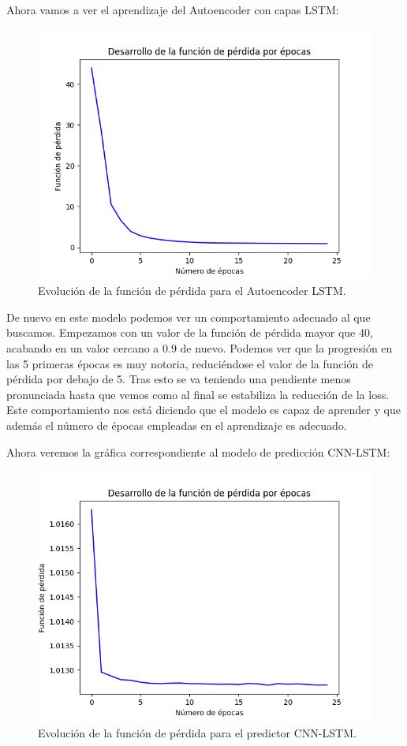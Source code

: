 Ahora vamos a ver el aprendizaje del Autoencoder con capas LSTM:
\begin{figure}[H]
	\centering
	\includegraphics[scale=0.75]{imagenes/loss_autoencoder_lstm.png}
	\caption{Evolución de la función de pérdida para el Autoencoder LSTM.}
	\label{img:loss-autoencoder-lstm}
\end{figure}

De nuevo en este modelo podemos ver un comportamiento adecuado al que buscamos. Empezamos con un valor de la función de pérdida mayor que 40, acabando en un valor cercano a $0.9$ de nuevo. Podemos ver que la progresión en las 5 primeras épocas es muy notoria, reduciéndose el valor de la función de pérdida por debajo de 5. Tras esto se va teniendo una pendiente menos pronunciada hasta que vemos como al final se estabiliza la reducción de la loss. Este comportamiento nos está diciendo que el modelo es capaz de aprender y que además el número de épocas empleadas en el aprendizaje es adecuado.

Ahora veremos la gráfica correspondiente al modelo de predicción CNN-LSTM:
\begin{figure}[H]
	\centering
	\includegraphics[scale=0.75]{imagenes/loss_cnn_lstm_forecaster.png}
	\caption{Evolución de la función de pérdida para el predictor CNN-LSTM.}
	\label{img:loss-cnn-lstm-forecaster}
\end{figure}

